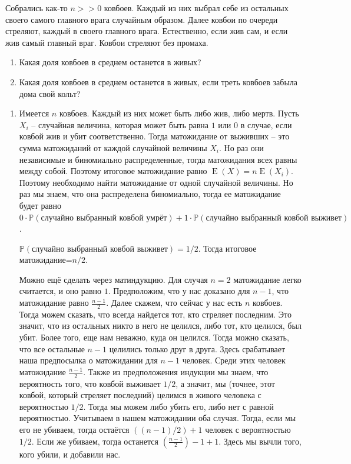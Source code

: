 \documentclass[nobib]{tufte-handout}
\theoremstyle{definition}
\newcounter{problem}
\newenvironment{problem}%
{%
\refstepcounter{problem}%
     \hypertarget{problem:{\theproblem}}{}
     \Writetofile{solution_file}{\protect\hypertarget{soln:\theproblem}{}}
     \begin{myenum}[label=\bfseries\protect\hyperlink{soln:\theproblem}{\theproblem},ref=\theproblem]
     \item%
    }%
    {%
    \end{myenum}}
\DeclareMathOperator{\E}{E}
\renewcommand{\P}{\mathbb{P}}
\begin{document}
\begin{problem}
Собрались как-то $n>>0$ ковбоев. Каждый из них выбрал себе из остальных своего самого главного врага случайным образом. Далее ковбои по очереди стреляют, каждый в своего главного врага. Естественно, если жив сам, и если жив самый главный враг. Ковбои стреляют без промаха.
\begin{enumerate}
\item Какая доля ковбоев в среднем останется в живых?
\item Какая доля ковбоев в среднем останется в живых, если треть ковбоев забыла дома свой кольт?
\end{enumerate}


\begin{sol}
\begin{enumerate}
\item Имеется $n$ ковбоев. Каждый из них может быть либо жив, либо мертв. Пусть $X_i$ – случайная величина, которая может быть равна $1$ или $0$ в случае, если ковбой жив и убит соответственно. Тогда матожидание от выживших – это сумма матожиданий от каждой случайной величины $X_i$. Но раз они независимые и биномиально распределенные, тогда матожидания всех равны между собой. Поэтому итоговое матожидание равно $\E(X) = n\E(X_{i})$. Поэтому необходимо найти матожидание от одной случайной величины. Но раз мы знаем, что она распределена биномиально, тогда ее матожидание будет равно $0\cdot\P(\text{случайно выбранный ковбой умрёт})+1\cdot\P(\text{случайно выбранный ковбой выживет})$.

$\P(\text{случайно выбранный ковбой выживет}) =1/2$.  Тогда итоговое матожидание=$n/2$.

Можно ещё сделать через матиндукцию. Для случая $n=2$ матожидание легко считается, и оно равно $1$. Предположим, что у нас доказано для $n-1$, что матожидание равно $\frac{n-1}{2}$. Далее скажем, что сейчас у нас есть $n$ ковбоев. Тогда можем сказать, что всегда найдется тот, кто стреляет последним. Это значит, что из остальных никто в него не целился, либо тот,  кто целился, был убит. Более того, еще нам неважно, куда он целился. Тогда можно сказать, что все остальные $n-1$ целились только друг в друга. Здесь срабатывает наша предпосылка о матожидании для $n-1$ человек. Среди этих человек матожидание $\frac{n-1}{2}$. Также из предположения индукции мы знаем, что вероятность того, что ковбой выживает $1/2$, а значит, мы (точнее, этот ковбой, который стреляет последний) целимся в живого человека с вероятностью $1/2$. Тогда мы можем либо убить его, либо нет с равной вероятностью. Учитываем в нашем матожидании оба случая. Тогда, если мы его не убиваем, тогда остаётся $((n-1)/2)+1$ человек с вероятностью $1/2$. Если же убиваем, тогда останется $\left(\frac{n-1}{2}\right) -1+1$. Здесь мы вычли того, кого убили, и добавили нас.


\end{enumerate}
\end{sol}
\end{problem}
\end{document}
